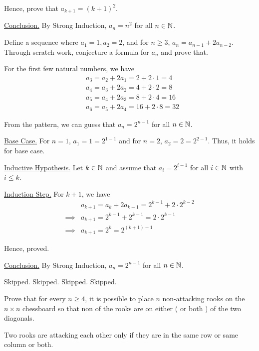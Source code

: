 	Hence, prove that $a_{k+1} = (k+1)^2$.

	\underline{Conclusion.} By Strong Induction, $a_n = n^2$ for all $n \in \mathbb{N}$.
	\es
	
\item Define a sequence where $a_1 = 1, a_2 = 2$, and for $n \geq 3$, $a_n = a_{n-1} + 2a_{n-2}$. 
	Through scratch work, conjecture a formula for $a_n$ and prove that.
	
	\begin{scratch}
		For the first few natural numbers, we have
		\begin{align*}
			&a_3 = a_2 + 2a_1 = 2 + 2 \cdot 1 = 4 \\
			&a_4 = a_3 + 2a_2 = 4 + 2 \cdot 2 = 8 \\
			&a_5 = a_4 + 2a_3 = 8 + 2 \cdot 4 = 16 \\
			&a_6 = a_5 + 2a_4 = 16 + 2 \cdot 8 = 32 
		\end{align*}

		From the pattern, we can guess that $a_n = 2^{n-1}$ for all $n \in \mathbb{N}$.
	\end{scratch}

	\bs
	\underline{Base Case.} For $n = 1$, $a_1 = 1 = 2^{1-1}$ and for $n = 2$, $a_2 = 2 = 2^{2-1}$. Thus, it holds for base case.

	\underline{Inductive Hypothesis.} Let $k \in \mathbb{N}$ and assume that $a_i = 2^{i-1}$ for all $i \in \mathbb{N}$ with $i \leq k$.

	\underline{Induction Step.} For $k+1$, we have
	\begin{align*}
		&a_{k+1} = a_{k} + 2a_{k-1} = 2^{k-1} + 2 \cdot 2^{k-2} \\
		\implies &a_{k+1}	= 2^{k-1} + 2^{k-1} = 2 \cdot 2^{k-1} \\
		\implies &a_{k+1} = 2^{k} = 2^{(k+1)-1}
	\end{align*}

	Hence, proved.

	\underline{Conclusion.} By Strong Induction, $a_n = 2^{n-1}$ for all $n \in \mathbb{N}$.
	\es
\enum
\ep

\bp Skipped. \ep
\bp Skipped. \ep
\bp Skipped. \ep
\bp Skipped. \ep

\bp Prove that for every $n \geq 4$, it is possible to place $n$ non-attacking rooks on the $n \times n$ chessboard so that non of the rooks are on either ( or both ) of the two diagonals. \ep

\bs

Two rooks are attacking each other only if they are in the same row or same column or both.

